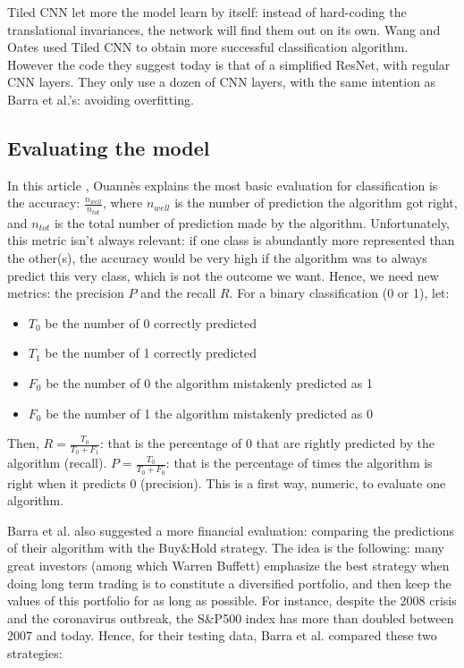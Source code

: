 \documentclass[11pt]{article}
\begin{document}
\begin{onehalfspace}
Tiled CNN let more the model learn by itself: instead of hard-coding the translational invariances, the network will find them out on its own. Wang and Oates \cite{wang} used Tiled CNN to obtain more successful classification algorithm. However the code they suggest today is that of a simplified ResNet, with regular CNN layers. They only use a dozen of CNN layers, with the same intention as Barra et al.'s: avoiding overfitting. 

\subsection{Evaluating the model}
\label{sec:LR_eval}

In this article \cite{ouannes}, Ouannès explains the most basic evaluation for classification is the accuracy: $\frac{n_{well}}{n_{tot}}$, where $n_{well}$ is the number of prediction the algorithm got right, and $n_{tot}$ is the total number of prediction made by the algorithm. Unfortunately, this metric isn't always relevant: if one class is abundantly more represented than the other(s), the accuracy would be very high if the algorithm was to always predict this very class, which is not the outcome we want. Hence, we need new metrics: the precision $P$ and the recall $R$. For a binary classification (0 or 1), let:

\begin{itemize}
    \item $T_0$ be the number of 0 correctly predicted
    \item $T_1$ be the number of 1 correctly predicted
    \item $F_0$ be the number of 0 the algorithm mistakenly predicted as 1
    \item $F_0$ be the number of 1 the algorithm mistakenly predicted as 0
\end{itemize}

Then, $R = \frac{T_0}{T_0 + F_1}$: that is the percentage of 0 that are rightly predicted by the algorithm (recall). $P = \frac{T_0}{T_0 + F_0}$: that is the percentage of times the algorithm is right when it predicts 0 (precision). This is a first way, numeric, to evaluate one algorithm.

Barra et al. \cite{barra} also suggested a more financial evaluation: comparing the predictions of their algorithm with the Buy\&Hold strategy. The idea is the following: many great investors (among which Warren Buffett) emphasize the best strategy when doing long term trading is to constitute a diversified portfolio, and then keep the values of this portfolio for as long as possible. For instance, despite the 2008 crisis and the coronavirus outbreak, the S\&P500 index has more than doubled between 2007 and today. Hence, for their testing data, Barra et al. compared these two strategies:


\end{onehalfspace}
\end{document}
